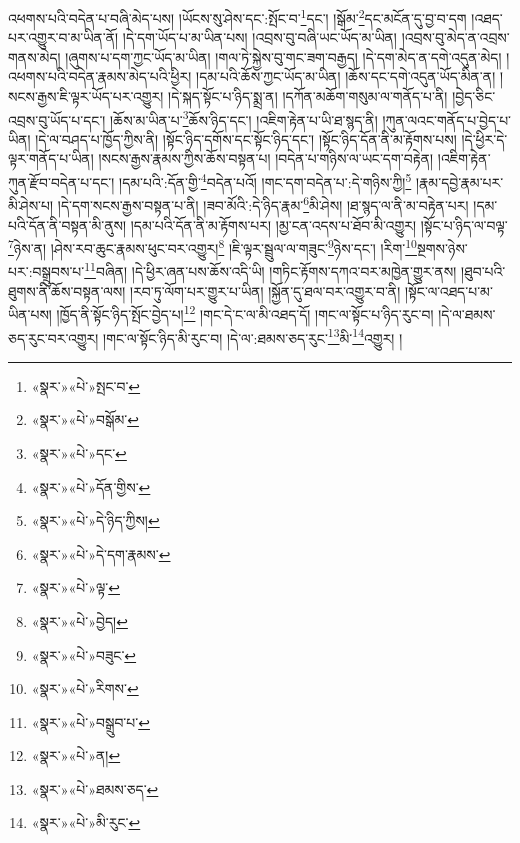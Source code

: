འཕགས་པའི་བདེན་པ་བཞི་མེད་པས། །ཡོངས་སུ་ཤེས་དང་:སྤོང་བ་\footnote{«སྣར་»«པེ་»སྤང་བ་}དང་། །སྒོམ་\footnote{«སྣར་»«པེ་»བསྒོམ་}དང་མངོན་དུ་བྱ་བ་དག །འཐད་པར་འགྱུར་བ་མ་ཡིན་ནོ། །དེ་དག་ཡོད་པ་མ་ཡིན་པས། །འབྲས་བུ་བཞི་ཡང་ཡོད་མ་ཡིན། །འབྲས་བུ་མེད་ན་འབྲས་གནས་མེད། །ཞུགས་པ་དག་ཀྱང་ཡོད་མ་ཡིན། །གལ་ཏེ་སྐྱེས་བུ་གང་ཟག་བརྒྱད། །དེ་དག་མེད་ན་དགེ་འདུན་མེད། །འཕགས་པའི་བདེན་རྣམས་མེད་པའི་ཕྱིར། །དམ་པའི་ཆོས་ཀྱང་ཡོད་མ་ཡིན། །ཆོས་དང་དགེ་འདུན་ཡོད་མིན་ན། །སངས་རྒྱས་ཇི་ལྟར་ཡོད་པར་འགྱུར། །དེ་སྐད་སྟོང་པ་ཉིད་སྨྲ་ན། །དཀོན་མཆོག་གསུམ་ལ་གནོད་པ་ནི། །བྱེད་ཅིང་འབྲས་བུ་ཡོད་པ་དང་། །ཆོས་མ་ཡིན་པ་\footnote{«སྣར་»«པེ་»དང་}ཆོས་ཉིད་དང་། །འཇིག་རྟེན་པ་ཡི་ཐ་སྙད་ནི། །ཀུན་ལའང་གནོད་པ་བྱེད་པ་ཡིན། །དེ་ལ་བཤད་པ་ཁྱོད་ཀྱིས་ནི། །སྟོང་ཉིད་དགོས་དང་སྟོང་ཉིད་དང་། །སྟོང་ཉིད་དོན་ནི་མ་རྟོགས་པས། །དེ་ཕྱིར་དེ་ལྟར་གནོད་པ་ཡིན། །སངས་རྒྱས་རྣམས་ཀྱིས་ཆོས་བསྟན་པ། །བདེན་པ་གཉིས་ལ་ཡང་དག་བརྟེན། །འཇིག་རྟེན་ཀུན་རྫོབ་བདེན་པ་དང་། །དམ་པའི་:དོན་གྱི་\footnote{«སྣར་»«པེ་»དོན་གྱིས་}བདེན་པའོ། །གང་དག་བདེན་པ་:དེ་གཉིས་ཀྱི།\footnote{«སྣར་»«པེ་»དེ་ཉིད་ཀྱིས།} །རྣམ་དབྱེ་རྣམ་པར་མི་ཤེས་པ། །དེ་དག་སངས་རྒྱས་བསྟན་པ་ནི། །ཟབ་མོའི་:དེ་ཉིད་རྣམ་\footnote{«སྣར་»«པེ་»དེ་དག་རྣམས་}མི་ཤེས། །ཐ་སྙད་ལ་ནི་མ་བརྟེན་པར། །དམ་པའི་དོན་ནི་བསྟན་མི་ནུས། །དམ་པའི་དོན་ནི་མ་རྟོགས་པར། །མྱ་ངན་འདས་པ་ཐོབ་མི་འགྱུར། །སྟོང་པ་ཉིད་ལ་བལྟ་\footnote{«སྣར་»«པེ་»ལྟ་}ཉེས་ན། །ཤེས་རབ་ཆུང་རྣམས་ཕུང་བར་འགྱུར།\footnote{«སྣར་»«པེ་»བྱེད།} །ཇི་ལྟར་སྦྲུལ་ལ་གཟུང་\footnote{«སྣར་»«པེ་»བཟུང་}ཉེས་དང་། །རིག་\footnote{«སྣར་»«པེ་»རིགས་}སྔགས་ཉེས་པར་:བསྒྲུབས་པ་\footnote{«སྣར་»«པེ་»བསྒྲུབ་པ་}བཞིན། །དེ་ཕྱིར་ཞན་པས་ཆོས་འདི་ཡི། །གཏིང་རྟོགས་དཀའ་བར་མཁྱེན་གྱུར་ནས། །ཐུབ་པའི་ཐུགས་ནི་ཆོས་བསྟན་ལས། །རབ་ཏུ་ལོག་པར་གྱུར་པ་ཡིན། །སྐྱོན་དུ་ཐལ་བར་འགྱུར་བ་ནི། །སྟོང་ལ་འཐད་པ་མ་ཡིན་པས། །ཁྱོད་ནི་སྟོང་ཉིད་སྤོང་བྱེད་པ།\footnote{«སྣར་»«པེ་»ན།} །གང་དེ་ང་ལ་མི་འཐད་དོ། །གང་ལ་སྟོང་པ་ཉིད་རུང་བ། །དེ་ལ་ཐམས་ཅད་རུང་བར་འགྱུར། །གང་ལ་སྟོང་ཉིད་མི་རུང་བ། །དེ་ལ་:ཐམས་ཅད་རུང་\footnote{«སྣར་»«པེ་»ཐམས་ཅད་}མི་\footnote{«སྣར་»«པེ་»མི་རུང་}འགྱུར། །
